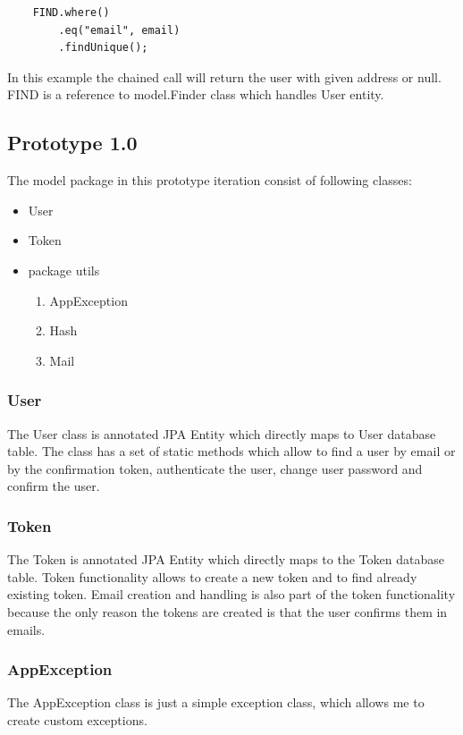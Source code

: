 \documentclass[12pt,twoside,a4paper]{report}
\begin{document}
\begin{lstlisting}
	FIND.where()
		.eq("email", email)
		.findUnique();
\end{lstlisting}

In this example the chained call will return the user with given address or null. FIND is a reference to model.Finder class which handles User entity.

\subsection{Prototype 1.0}\label{4.4.1}
The model package in this prototype iteration consist of following classes:
\begin{itemize}
	\item User
	\item Token
	\item package utils
	\begin{enumerate}
	\item AppException
	\item Hash
	\item Mail
	\end{enumerate}
\end{itemize}

\subsubsection{User}
The User class is annotated JPA Entity which directly maps to User database table. The class has a set of static methods which allow to find a user by email or by the confirmation token, authenticate the user, change user password and confirm the user.

\subsubsection{Token}
The Token is annotated JPA Entity which directly maps to the Token database table. Token functionality allows to create a new token and to find already existing token. Email creation and handling is also part of the token functionality because the only reason the tokens are created is that the user confirms them in emails.

\subsubsection{AppException}
The AppException class is just a simple exception class, which allows me to create custom exceptions.
\end{document}
